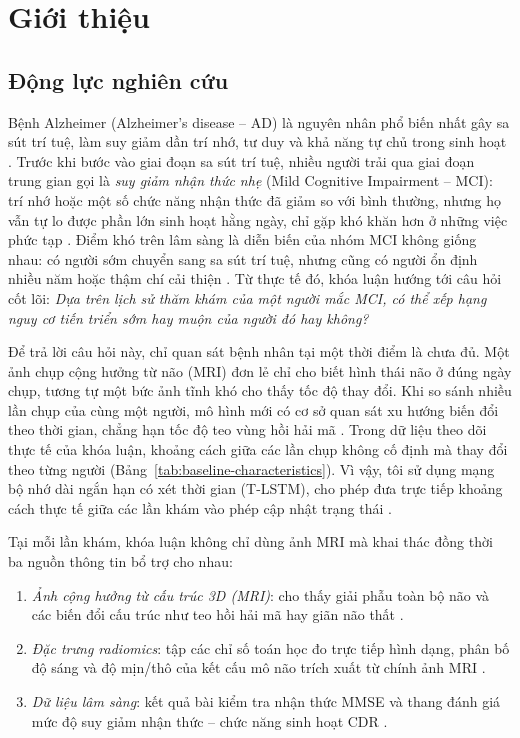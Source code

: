 \chapter{Giới thiệu}
\label{chap:intro}

\section{Động lực nghiên cứu}
Bệnh Alzheimer (Alzheimer's disease -- AD) là nguyên nhân phổ biến nhất gây sa sút trí tuệ, làm suy giảm dần trí nhớ, tư duy và khả năng tự chủ trong sinh hoạt \cite{cdc2024alzheimers}. Trước khi bước vào giai đoạn sa sút trí tuệ, nhiều người trải qua giai đoạn trung gian gọi là \emph{suy giảm nhận thức nhẹ} (Mild Cognitive Impairment -- MCI): trí nhớ hoặc một số chức năng nhận thức đã giảm so với bình thường, nhưng họ vẫn tự lo được phần lớn sinh hoạt hằng ngày, chỉ gặp khó khăn hơn ở những việc phức tạp \cite{jack2018niaaa}. Điểm khó trên lâm sàng là diễn biến của nhóm MCI không giống nhau: có người sớm chuyển sang sa sút trí tuệ, nhưng cũng có người ổn định nhiều năm hoặc thậm chí cải thiện \cite{petersen2018mci}. Từ thực tế đó, khóa luận hướng tới câu hỏi cốt lõi: \emph{Dựa trên lịch sử thăm khám của một người mắc MCI, có thể xếp hạng nguy cơ tiến triển sớm hay muộn của người đó hay không?}

Để trả lời câu hỏi này, chỉ quan sát bệnh nhân tại một thời điểm là chưa đủ. Một ảnh chụp cộng hưởng từ não (MRI) đơn lẻ chỉ cho biết hình thái não ở đúng ngày chụp, tương tự một bức ảnh tĩnh khó cho thấy tốc độ thay đổi. Khi so sánh nhiều lần chụp của cùng một người, mô hình mới có cơ sở quan sát xu hướng biến đổi theo thời gian, chẳng hạn tốc độ teo vùng hồi hải mã \cite{dong2021deepatrophy}. Trong dữ liệu theo dõi thực tế của khóa luận, khoảng cách giữa các lần chụp không cố định mà thay đổi theo từng người (Bảng~\ref{tab:baseline-characteristics}). Vì vậy, tôi sử dụng mạng bộ nhớ dài ngắn hạn có xét thời gian (T-LSTM), cho phép đưa trực tiếp khoảng cách thực tế giữa các lần khám vào phép cập nhật trạng thái \cite{baytas2017patient}.

Tại mỗi lần khám, khóa luận không chỉ dùng ảnh MRI mà khai thác đồng thời ba nguồn thông tin bổ trợ cho nhau:
\begin{enumerate}
\item \emph{Ảnh cộng hưởng từ cấu trúc 3D (MRI)}: cho thấy giải phẫu toàn bộ não và các biến đổi cấu trúc như teo hồi hải mã hay giãn não thất \cite{weiner2015impact}.
\item \emph{Đặc trưng radiomics}: tập các chỉ số toán học đo trực tiếp hình dạng, phân bố độ sáng và độ mịn/thô của kết cấu mô não trích xuất từ chính ảnh MRI \cite{vangriethuysen2017computational}.
\item \emph{Dữ liệu lâm sàng}: kết quả bài kiểm tra nhận thức MMSE và thang đánh giá mức độ suy giảm nhận thức -- chức năng sinh hoạt CDR \cite{folstein1975mmse,morris1993cdr}.
\end{enumerate}


